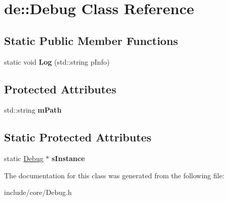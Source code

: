 \hypertarget{classde_1_1_debug}{
\section{de\-:\-:\-Debug \-Class \-Reference}
\label{classde_1_1_debug}
}
\subsection*{\-Static \-Public \-Member \-Functions}
\begin{DoxyCompactItemize}
\item 
\hypertarget{classde_1_1_debug_a87d49a56764c788a9e563f90a5755301}{
static void {\bfseries \-Log} (std\-::string p\-Info)}
\label{classde_1_1_debug_a87d49a56764c788a9e563f90a5755301}

\end{DoxyCompactItemize}
\subsection*{\-Protected \-Attributes}
\begin{DoxyCompactItemize}
\item 
\hypertarget{classde_1_1_debug_a0db959b3bc57df16fdf0fcd47daa291b}{
std\-::string {\bfseries m\-Path}}
\label{classde_1_1_debug_a0db959b3bc57df16fdf0fcd47daa291b}

\end{DoxyCompactItemize}
\subsection*{\-Static \-Protected \-Attributes}
\begin{DoxyCompactItemize}
\item 
\hypertarget{classde_1_1_debug_acd5e31a4a54fc528dfdc202d36c0c7ac}{
static \hyperlink{classde_1_1_debug}{\-Debug} $\ast$ {\bfseries s\-Instance}}
\label{classde_1_1_debug_acd5e31a4a54fc528dfdc202d36c0c7ac}

\end{DoxyCompactItemize}


\-The documentation for this class was generated from the following file\-:\begin{DoxyCompactItemize}
\item 
include/core/\-Debug.\-h\end{DoxyCompactItemize}
